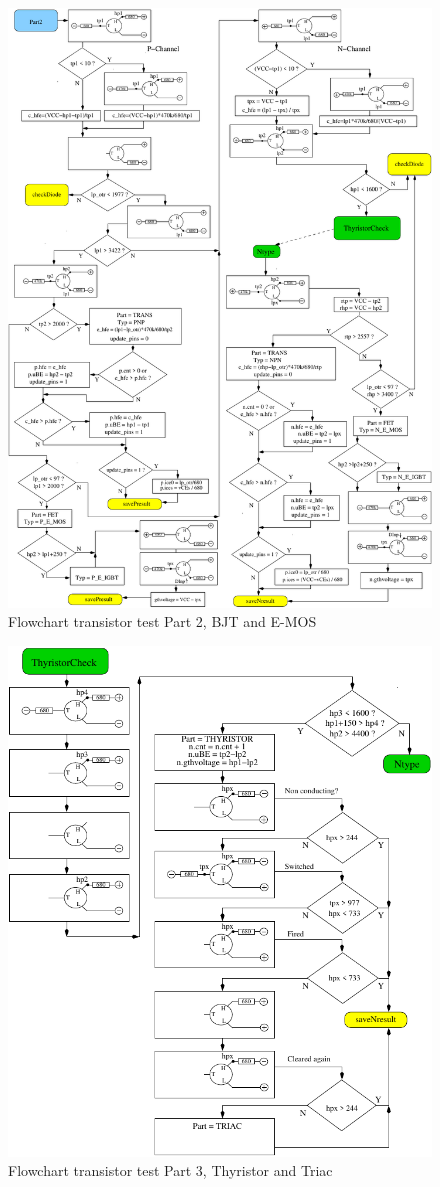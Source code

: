 \begin{figure}[H]
\centering
\includegraphics[width=.8\textwidth]{../FIG/CheckSemi2.pdf}
\caption{Flowchart transistor test Part 2, BJT and E-MOS}
\label{fig:ChkSemi2}
\end{figure}

\begin{figure}[H]
\centering
\includegraphics[width=.8\textwidth]{../FIG/CheckSemi3.pdf}
\caption{Flowchart transistor test Part 3, Thyristor and Triac}
\label{fig:ChkSemi3}
\end{figure}


